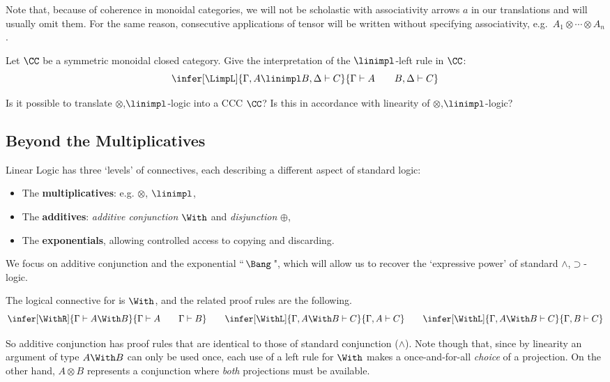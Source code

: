 \documentclass{svmult}
\begin{document}
%
Note that, because of coherence in monoidal categories, we will not be scholastic with associativity arrows $a$ in our translations and will usually omit them. For the same reason, consecutive applications of tensor will be written without specifying associativity, e.g.~$A_1\otimes\cdots\otimes A_n$.

\begin{myexercise} Let $\CC$ be a symmetric monoidal closed category. Give the interpretation of the $\linimpl$-left rule in $\CC$:
        \[ \infer[\LimpL]{\Gamma , A \linimpl B, \Delta \vdash C}{\Gamma \vdash A \qquad B, \Delta \vdash C} \]
\end{myexercise}

\begin{myexercise}
Is it possible to translate $\otimes$,$\linimpl$-logic into a CCC $\CC$? Is this in accordance with linearity of $\otimes$,$\linimpl$-logic?
\end{myexercise}


\subsection{Beyond the Multiplicatives}
Linear Logic has three `levels' of connectives, each describing a different aspect of standard logic:
\begin{itemize}
\item The \textbf{multiplicatives}: e.g. $\otimes$, $\linimpl$,
\item The \textbf{additives}: \emph{additive conjunction} $\With$ and \emph{disjunction} $\oplus$,
\item The \textbf{exponentials}, allowing controlled access to copying and  discarding.
\end{itemize}
%
We focus on additive conjunction and the exponential ``\,$\Bang$\,", which will allow us to recover the `expressive power' of standard
$\wedge$,$\supset$-logic.

\begin{mydefinition}\label{d:With} The logical connective for  is $\With$, and the related proof rules are the following.
\[\infer[\WithR]{\Gamma \vdash A \With B}{\Gamma \vdash A \qquad \Gamma \vdash B}
\qquad \infer[\WithL]{\Gamma , A \With B \vdash C}{\Gamma , A \vdash C} \qquad \infer[\WithL]{\Gamma , A \With B \vdash C}{\Gamma , B \vdash C}
\]\deq[-1]
\end{mydefinition}
So additive conjunction has proof rules that are identical to those of standard conjunction ($\wedge$). Note though that, since by linearity an
argument of type $A \With B$ can only be used once, each use of a left rule for $\With$ makes a once-and-for-all \emph{choice} of a projection. On the
other hand, $A\otimes B$ represents a conjunction where \emph{both} projections must be available.
\end{document}
